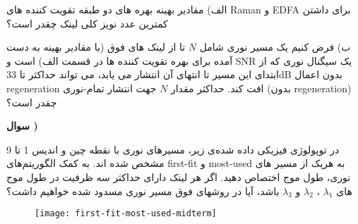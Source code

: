 \documentclass[10pt,letterpaper]{article}
\newcounter{QuestionNumber}
\newcommand{\Q}{
\textbf{سوال \theQuestionNumber)}
\stepcounter{QuestionNumber}
}
\begin{document}
الف) مقادیر بهینه بهره های دو طبقه تقویت کننده های Raman و EDFA برای داشتن کمترین عدد نویز کلی لینک چقدر است؟

ب) فرض کنیم یک مسیر نوری شامل $N$ تا از لینک های فوق (با مقادیر بهینه به دست آمده برای بهره تقویت کننده ها در قسمت الف) است و SNR یک سیگنال نوری که از ابتدای این مسیر تا انتهای آن انتشار می یابد، می تواند حداکثر تا 33dB بدون اعمال regeneration افت کند. حداکثر مقدار $N$ جهت انتشار تمام-نوری (بدون regeneration) چقدر است؟

\newpage
\Q

در توپولوژی فیزیکی داده شده‌ی زیر، مسیرهای نوری با نقطه چین و اندیس 1 تا 9 مشخص شده اند. به کمک الگوریتم‌های first-fit و most-used به هریک از مسیر های نوری، طول موج اختصاص دهید. اگر هر لینک دارای حداکثر سه ظرفیت در طول موج های 
$
\lambda_1
$
،
$
\lambda_2
$
و
$
\lambda_3
$
 باشد، آیا در روشهای فوق مسیر نوری مسدود شده خواهیم داشت؟

\begin{figure}[h]
\centering
\texttt{[image: first-fit-most-used-midterm]}
\end{figure}
\end{document}
